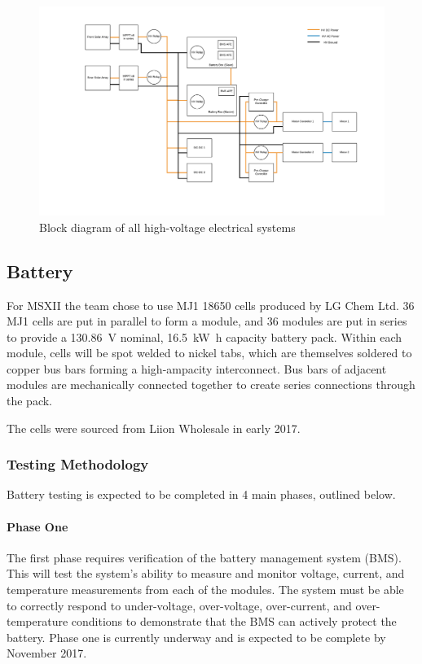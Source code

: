 \documentclass[10pt]{article}
\begin{document}
\begin{figure}
\centering
\includegraphics[width=\textwidth]{figures/msxii-electrical-hv-block-diagram}
\caption{Block diagram of all high-voltage electrical systems}
\label{fig:msxii-electrical-hv-block-diagram}
\end{figure}


\subsection{Battery}
For MSXII the team chose to use MJ1 18650 cells produced by LG Chem Ltd. 36 MJ1 cells are put in parallel to form a module, and 36 modules are put in series to provide a \SI{130.86}{\volt} nominal, \SI{16.5}{\kilo\watt\hour} capacity battery pack. Within each module, cells will be spot welded to nickel tabs, which are themselves soldered to copper bus bars forming a high-ampacity interconnect. Bus bars of adjacent modules are mechanically connected together to create series connections through the pack.

The cells were sourced from Liion Wholesale in early 2017.

\subsubsection{Testing Methodology}
Battery testing is expected to be completed in 4 main phases, outlined below.

\paragraph{Phase One}
The first phase requires verification of the battery management system (BMS). This will test the system's ability to measure and monitor voltage, current, and temperature measurements from each of the modules. The system must be able to correctly respond to under-voltage, over-voltage, over-current, and over-temperature conditions to demonstrate that the BMS can actively protect the battery. Phase one is currently underway and is expected to be complete by November 2017. 
\end{document}
